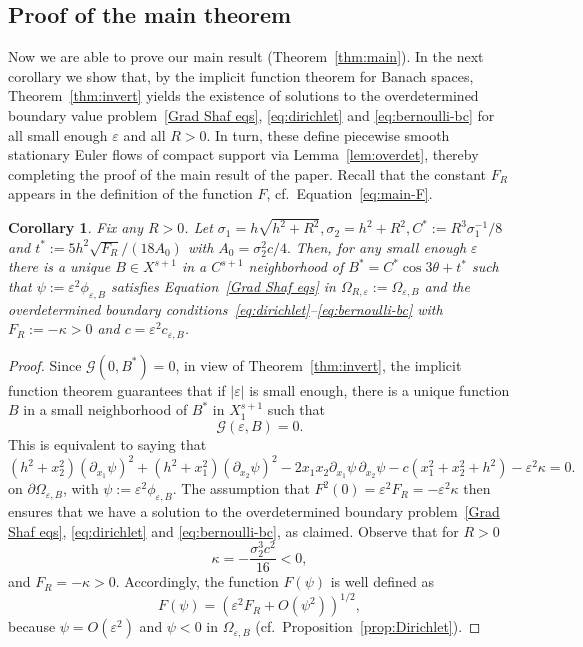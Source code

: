 \documentclass[12pt,reqno]{amsart}
\numberwithin{equation}{section}
\newtheorem{corollary}[theorem]{Corollary}
\theoremstyle{definition}
\theoremstyle{remark}
\begin{document}
\subsection{Proof of the main theorem} 

Now we are able to prove our main result (Theorem~\ref{thm:main}). In the next corollary we show that, by the implicit function theorem for Banach spaces, Theorem~\ref{thm:invert} yields the existence of solutions to the overdetermined boundary value problem~\eqref{Grad Shaf eqs}, \eqref{eq:dirichlet} and \eqref{eq:bernoulli-bc} for all small enough $\varepsilon$ and all $R>0$.
In turn, these define piecewise smooth stationary Euler flows of compact support via Lemma~\ref{lem:overdet}, thereby completing the proof of the main result of the paper.
Recall that the constant $F_R$ appears in the definition of the function $F$, cf.\ Equation~\eqref{eq:main-F}.

\begin{corollary}\label{cor:existence}
	Fix any $R>0$. Let $ \sigma_1=h\sqrt{h^2+R^2}, \sigma_2=h^2+R^2,  C^*:=R^3\sigma_1^{-1}/8 $ and $ t^*:=5h^2\sqrt{F_R}/(18A_0) $ with $ A_0 = \sigma_2^2c/4. $
	Then, for any small enough $\varepsilon$ there is a unique $B \in X^{s+1}$ in a $C^{s+1}$ neighborhood of $B^*=C^*\cos3\theta+t^*$ such that $\psi := \varepsilon^2 \phi_{\varepsilon,B}$ satisfies Equation~\eqref{Grad Shaf eqs} in $\varOmega_{R,\varepsilon} := \varOmega_{\varepsilon, B}$ and the overdetermined boundary conditions~\eqref{eq:dirichlet}--\eqref{eq:bernoulli-bc} with $F_R := -\kappa > 0$ and $c = \varepsilon^2 c_{\varepsilon,B}$.
\end{corollary}

\begin{proof}
	Since $\mathcal{G}(0,B^*)=0$, in view of Theorem~\ref{thm:invert}, the implicit function theorem guarantees that if $|\varepsilon|$ is small enough, there is a unique function $B$ in a small neighborhood of $B^*$ in $X^{s+1}_1$ such that
	\[
	\mathcal{G}(\varepsilon,B) = 0 .
	\]
	This is equivalent to saying that
	\[
(h^2+x_2^2)(\partial_{x_1}\psi)^2+(h^2+x_1^2)(\partial_{x_2}\psi)^2
-2x_1x_2\partial_{x_1}\psi\,\partial_{x_2}\psi
-c(x_1^2+x_2^2+h^2)- \varepsilon^2 \kappa = 0.
	\]
	on $\partial\varOmega_{\varepsilon, B}$, with $\psi := \varepsilon^2\phi_{\varepsilon,B}$.
	The assumption that $F^2(0) = \varepsilon^2 F_R = -\varepsilon^2\kappa$ then ensures that we have a solution to the overdetermined boundary problem~\eqref{Grad Shaf eqs}, \eqref{eq:dirichlet} and \eqref{eq:bernoulli-bc}, as claimed.
	Observe that for $ R>0 $
	\[
	\kappa = -\frac{\sigma_2^3c^2}{16} < 0 ,
	\]
	and  $F_R=-\kappa > 0$.
	Accordingly, the function $F(\psi)$ is well defined as
	\[
	F (\psi) = \left ( \varepsilon^2 F_R   + O(\psi^2) \right )^{1/2} ,
	\]
	because $\psi = O(\varepsilon^2)$ and $\psi < 0$ in $\varOmega_{\varepsilon, B}$ (cf.\ Proposition~\ref{prop:Dirichlet}).
\end{proof}
\end{document}
